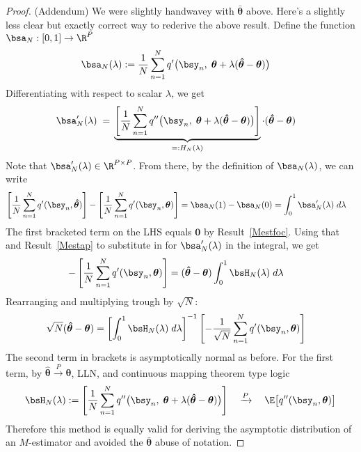 \documentclass[12pt]{article}
\theoremstyle{plain}
\theoremstyle{definition}
\theoremstyle{remark}
\newcommand{\ra}{\rightarrow}
\newcommand{\bstheta}{\boldsymbol{\theta}}
\newcommand{\bshattheta}{\boldsymbol{\hat{\theta}}}
\newcommand{\bsbartheta}{\boldsymbol{\bar{\theta}}}
\renewcommand{\bso}{\boldsymbol{0}}
\newcommand{\pto}{\xrightarrow{P}}
\newcommand{\sumnN}{\sum^N_{n=1}}
\begin{document}
\begin{proof}(Addendum)
We were slightly handwavey with $\bsbartheta$ above.
Here's a slightly less clear but exactly correct way to rederive the
above result.
Define the function $\bsa_N:[0,1]\ra\R^P$
\begin{align}
  \bsa_N(\lambda)
  :=&\;
  \frac{1}{N}
  \sumnN
  q'\big(\bsy_n,\;\bstheta+\lambda(\bshattheta-\bstheta)\big)
\end{align}
Differentiating with respect to scalar $\lambda$, we get
\begin{align}
  \bsa_N'(\lambda)
  \;=&\;
  \underbrace{%
  \left[
  \frac{1}{N}
  \sumnN
  q''\big(\bsy_n,\;\bstheta+\lambda(\bshattheta-\bstheta)\big)
  \right]
  }_{=:H_N(\lambda)}
  \cdot
  (\bshattheta-\bstheta)
  \label{Mestap}
\end{align}
Note that $\bsa'_N(\lambda)\in\R^{P\times P}$.
From there, by the definition of $\bsa_N(\lambda)$, we can write
\begin{align*}
  \left[
  \frac{1}{N}
  \sumnN
  q'(\bsy_n,\bshattheta)
  \right]
  -
  \left[
  \frac{1}{N}
  \sumnN
  q'(\bsy_n,\bstheta)
  \right]
  &= \bsa_N(1)-\bsa_N(0)
  = \int_0^1\bsa_N'(\lambda)\;d\lambda
\end{align*}
The first bracketed term on the LHS equals $\bso$ by
Result~\ref{Mestfoc}.
Using that and Result~\ref{Mestap} to substitute in for
$\bsa'_N(\lambda)$ in the integral, we get
\begin{align*}
  -
  \left[
  \frac{1}{N}
  \sumnN
  q'(\bsy_n,\bstheta)
  \right]
  &= (\bshattheta-\bstheta)\int_0^1\bsH_N(\lambda)\;d\lambda
\end{align*}
Rearranging and multiplying trough by $\sqrt{N}$:
\begin{align*}
  \sqrt{N}(\bshattheta-\bstheta)
  &=
  \left[
  \int_0^1\bsH_N(\lambda)\;d\lambda
  \right]^{-1}
  \left[-
    \frac{1}{\sqrt{N}}
  \sumnN
  q'(\bsy_n,\bstheta)
  \right]
\end{align*}
The second term in brackets is asymptotically normal as before.
For the first term, by $\bshattheta\pto\bstheta$, LLN, and continuous
mapping theorem type logic
\begin{align*}
  \bsH_N(\lambda)
  :=
  \left[
  \frac{1}{N}
  \sumnN
  q''\big(\bsy_n,\;\bstheta+\lambda(\bshattheta-\bstheta)\big)
  \right]
  \quad\pto\quad
  \E\big[q''(\bsy_n,\bstheta)\big]
\end{align*}
Therefore this method is equally valid for deriving the asymptotic
distribution of an $M$-estimator and avoided the $\bsbartheta$ abuse of
notation.
\end{proof}
\end{document}
